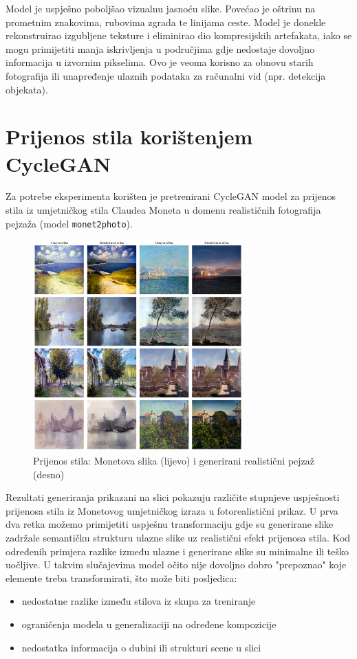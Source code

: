 \documentclass[times, utf8, seminar, numeric]{fer}
\begin{document}
	Model je uspješno poboljšao vizualnu jasnoću slike. Povećao je oštrinu na prometnim znakovima, rubovima zgrada te linijama ceste. Model je donekle rekonstruirao izgubljene teksture i eliminirao dio kompresijskih artefakata, iako se mogu primijetiti manja iskrivljenja u područjima gdje nedostaje dovoljno informacija u izvornim pikselima. Ovo je veoma korisno za obnovu starih fotografija ili unapređenje ulaznih podataka za računalni vid (npr. detekcija objekata).
	
	\section{Prijenos stila korištenjem CycleGAN}
	Za potrebe eksperimenta korišten je pretrenirani CycleGAN model za prijenos stila iz umjetničkog stila Claudea Moneta u domenu realističnih fotografija pejzaža (model \texttt{monet2photo}). \cite{CycleGAN2017}
	
	\begin{figure}[H]
		\centering
		\includegraphics[width=0.72\textwidth]{images/experiment/style/monet2photo.png}
		\caption{Prijenos stila: Monetova slika (lijevo) i generirani realistični pejzaž (desno)}
	\end{figure}
	
	Rezultati generiranja prikazani na slici pokazuju različite stupnjeve uspješnosti prijenosa stila iz Monetovog umjetničkog izraza u fotorealistični prikaz. U prva dva retka možemo primijetiti uspješnu transformaciju gdje su generirane slike zadržale semantičku strukturu ulazne slike uz realistični efekt prijenosa stila. Kod određenih primjera razlike između ulazne i generirane slike su minimalne ili teško uočljive. U takvim slučajevima model očito nije dovoljno dobro "prepoznao" koje elemente treba transformirati, što može biti posljedica:
	\begin{itemize}
		\item nedostatne razlike između stilova iz skupa za treniranje
		\item ograničenja modela u generalizaciji na određene kompozicije
		\item nedostatka informacija o dubini ili strukturi scene u slici
	\end{itemize}
	
\end{document}
